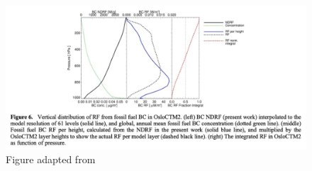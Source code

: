 \begin{figure}[h]
    \centering
    \includegraphics[width =0.8\linewidth]{Appendix/images/Myrhe2011.jpeg}
    \caption{Figure adapted from \cite{MYHRE2011387}}
    \label{fig:Myhre2011}
\end{figure}